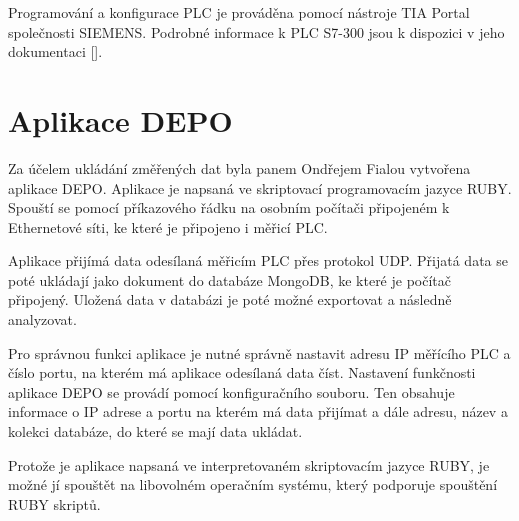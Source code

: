 Programování a konfigurace PLC je prováděna pomocí nástroje TIA Portal společnosti SIEMENS. Podrobné informace k PLC S7-300 jsou k dispozici v jeho dokumentaci [\cite{siemens_plc}].  

\section{Aplikace DEPO} 
\label{aplikacedepo}
Za účelem ukládání změřených dat byla panem Ondřejem Fialou vytvořena aplikace DEPO. Aplikace je napsaná ve skriptovací programovacím jazyce RUBY. Spouští se pomocí příkazového řádku na osobním počítači připojeném k Ethernetové síti, ke které je připojeno i měřicí PLC. 

Aplikace přijímá data odesílaná měřicím PLC přes protokol UDP. Přijatá data se poté ukládají jako dokument do databáze MongoDB, ke které je počítač připojený. Uložená data v databázi je poté možné exportovat a následně analyzovat.

Pro správnou funkci aplikace je nutné správně nastavit adresu IP měřícího PLC a číslo portu, na kterém má aplikace odesílaná data číst. Nastavení funkčnosti aplikace DEPO se provádí pomocí konfiguračního souboru. Ten obsahuje informace o IP adrese a portu na kterém má data přijímat a dále adresu, název a kolekci databáze, do které se mají data ukládat.

Protože je aplikace napsaná ve interpretovaném skriptovacím jazyce RUBY, je možné jí spouštět na libovolném operačním systému, který podporuje spouštění RUBY skriptů. 
